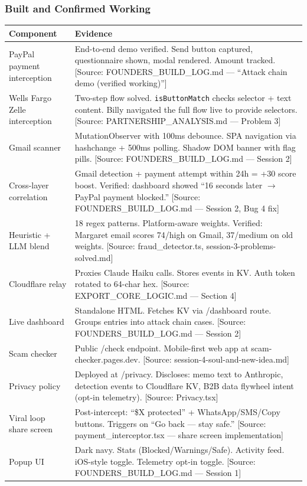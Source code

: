 \documentclass[11pt, letterpaper]{article}
\newcommand{\source}[1]{\textcolor{citation}{[Source: #1]}}
\begin{document}
  \subsubsection{Built and Confirmed Working}

  \begin{longtable}{p{5cm} p{8cm}}
  \toprule
  \textbf{Component} & \textbf{Evidence} \\
  \midrule
  PayPal payment interception & End-to-end demo verified. Send button captured, questionnaire shown, modal rendered. Amount tracked. \source{FOUNDERS\_BUILD\_LOG.md --- ``Attack chain demo (verified working)''} \\
  \midrule
  Wells Fargo Zelle interception & Two-step flow solved. \texttt{isButtonMatch} checks selector + text content. Billy navigated the full flow live to provide selectors. \source{PARTNERSHIP\_ANALYSIS.md --- Problem 3} \\
  \midrule
  Gmail scanner & MutationObserver with 100ms debounce. SPA navigation via hashchange + 500ms polling. Shadow DOM banner with flag pills. \source{FOUNDERS\_BUILD\_LOG.md --- Session 2} \\
  \midrule
  Cross-layer correlation & Gmail detection + payment attempt within 24h = +30 score boost. Verified: dashboard showed ``16 seconds later $\rightarrow$ PayPal payment blocked.'' \source{FOUNDERS\_BUILD\_LOG.md --- Session 2, Bug 4 fix} \\
  \midrule
  Heuristic + LLM blend & 18 regex patterns. Platform-aware weights. Verified: Margaret email scores 74/high on Gmail, 37/medium on old weights. \source{fraud\_detector.ts, session-3-problems-solved.md} \\
  \midrule
  Cloudflare relay & Proxies Claude Haiku calls. Stores events in KV. Auth token rotated to 64-char hex. \source{EXPORT\_CORE\_LOGIC.md --- Section 4} \\
  \midrule
  Live dashboard & Standalone HTML. Fetches KV via /dashboard route. Groups entries into attack chain cases. \source{FOUNDERS\_BUILD\_LOG.md --- Session 2} \\
  \midrule
  Scam checker & Public /check endpoint. Mobile-first web app at scam-checker.pages.dev. \source{session-4-soul-and-new-idea.md} \\
  \midrule
  Privacy policy & Deployed at /privacy. Discloses: memo text to Anthropic, detection events to Cloudflare KV, B2B data flywheel intent (opt-in telemetry). \source{Privacy.tsx} \\
  \midrule
  Viral loop share screen & Post-intercept: ``\$X protected'' + WhatsApp/SMS/Copy buttons. Triggers on ``Go back --- stay safe.'' \source{payment\_interceptor.tsx --- share screen implementation} \\
  \midrule
  Popup UI & Dark navy. Stats (Blocked/Warnings/Safe). Activity feed. iOS-style toggle. Telemetry opt-in toggle. \source{FOUNDERS\_BUILD\_LOG.md --- Session 1} \\
  \bottomrule
  \end{longtable}
\end{document}
